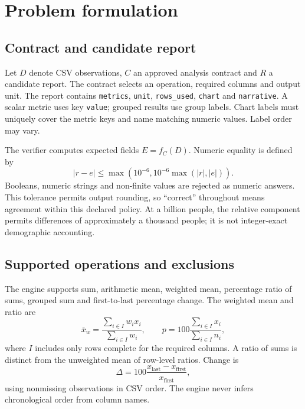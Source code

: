 \section{Problem formulation}
\subsection{Contract and candidate report}
Let $D$ denote CSV observations, $C$ an approved analysis contract and $R$ a candidate report. The contract selects an operation, required columns and output unit. The report contains \texttt{metrics}, \texttt{unit}, \texttt{rows\_used}, \texttt{chart} and \texttt{narrative}. A scalar metric uses key \texttt{value}; grouped results use group labels. Chart labels must uniquely cover the metric keys and name matching numeric values. Label order may vary.

The verifier computes expected fields $E=f_C(D)$. Numeric equality is defined by
\begin{equation}\label{eq:tolerance}
 |r-e|\leq\max\!\left(10^{-6},10^{-6}\max(|r|,|e|)\right).
\end{equation}
Booleans, numeric strings and non-finite values are rejected as numeric answers. This tolerance permits output rounding, so ``correct'' throughout means agreement within this declared policy. At a billion people, the relative component permits differences of approximately a thousand people; it is not integer-exact demographic accounting.

\subsection{Supported operations and exclusions}
The engine supports sum, arithmetic mean, weighted mean, percentage ratio of sums, grouped sum and first-to-last percentage change. The weighted mean and ratio are
\begin{equation}
 \bar{x}_w=\frac{\sum_{i\in I}w_i x_i}{\sum_{i\in I}w_i},\qquad
 p=100\frac{\sum_{i\in I}x_i}{\sum_{i\in I}n_i},
\end{equation}
where $I$ includes only rows complete for the required columns. A ratio of sums is distinct from the unweighted mean of row-level ratios. Change is
\begin{equation}
 \Delta=100\frac{x_{\mathrm{last}}-x_{\mathrm{first}}}{x_{\mathrm{first}}},
\end{equation}
using nonmissing observations in CSV order. The engine never infers chronological order from column names.

